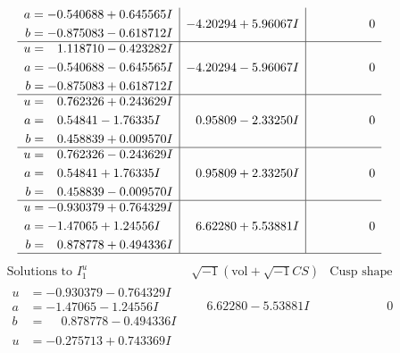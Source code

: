 \documentclass[1p]{elsarticle_modified}
\theoremstyle{definition}
\newcommand{\I}{\sqrt{-1}}
\begin{document}
$$\begin{array}{c|c|c}
\begin{aligned}
a &= -0.540688 + 0.645565 I \\
b &= -0.875083 - 0.618712 I\end{aligned}
 & -4.20294 + 5.96067 I & \phantom{-0.000000 } 0 \\ \hline\begin{aligned}
u &= \phantom{-}1.118710 - 0.423282 I \\
a &= -0.540688 - 0.645565 I \\
b &= -0.875083 + 0.618712 I\end{aligned}
 & -4.20294 - 5.96067 I & \phantom{-0.000000 } 0 \\ \hline\begin{aligned}
u &= \phantom{-}0.762326 + 0.243629 I \\
a &= \phantom{-}0.54841 - 1.76335 I \\
b &= \phantom{-}0.458839 + 0.009570 I\end{aligned}
 & \phantom{-}0.95809 - 2.33250 I & \phantom{-0.000000 } 0 \\ \hline\begin{aligned}
u &= \phantom{-}0.762326 - 0.243629 I \\
a &= \phantom{-}0.54841 + 1.76335 I \\
b &= \phantom{-}0.458839 - 0.009570 I\end{aligned}
 & \phantom{-}0.95809 + 2.33250 I & \phantom{-0.000000 } 0 \\ \hline\begin{aligned}
u &= -0.930379 + 0.764329 I \\
a &= -1.47065 + 1.24556 I \\
b &= \phantom{-}0.878778 + 0.494336 I\end{aligned}
 & \phantom{-}6.62280 + 5.53881 I & \phantom{-0.000000 } 0\\
 \hline 
 \end{array}$$\newpage$$\begin{array}{c|c|c}  
\text{Solutions to }I^u_{1}& \I (\text{vol} + \sqrt{-1}CS) & \text{Cusp shape}\\
 \hline 
\begin{aligned}
u &= -0.930379 - 0.764329 I \\
a &= -1.47065 - 1.24556 I \\
b &= \phantom{-}0.878778 - 0.494336 I\end{aligned}
 & \phantom{-}6.62280 - 5.53881 I & \phantom{-0.000000 } 0 \\ \hline\begin{aligned}
u &= -0.275713 + 0.743369 I \\

\end{aligned}
\end{array}$$
\end{document}
